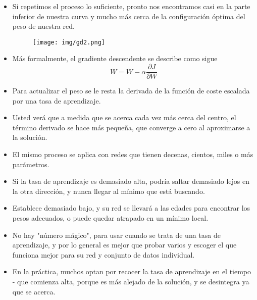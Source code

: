 \begin{frame}{\titulo}{\subtitulo}
    \begin{itemize}
        \footnotesize
        \item Si repetimos el proceso lo suficiente, pronto nos encontramos casi en la parte inferior de nuestra curva y mucho más cerca de la configuración óptima del peso de nuestra red.
        \begin{figure}[H]
            \texttt{[image: img/gd2.png]}
        \end{figure}

        \item Más formalmente, el gradiente descendente se describe como sigue $$ W = W - \alpha\frac{\partial J}{\partial W} $$

        \item Para actualizar el peso se le resta la derivada de la función de coste escalada por una tasa de aprendizaje.\bigskip

        \item Usted verá que a medida que se acerca cada vez más cerca del centro, el término derivado se hace más pequeña, que converge a cero al aproximarse a la solución.\bigskip

        \item El mismo proceso se aplica con redes que tienen decenas, cientos, miles o más parámetros.
    \end{itemize}
\end{frame}

\begin{frame}{\titulo}{\subtitulo}
    \begin{itemize}

        \item Si la tasa de aprendizaje es demasiado alta, podría saltar demasiado lejos en la otra dirección, y nunca llegar al mínimo que está buscando.\bigskip

        \item Establece demasiado bajo, y su red se llevará a las edades para encontrar los pesos adecuados, o puede quedar atrapado en un mínimo local.\bigskip

        \item No hay "número mágico", para usar cuando se trata de una tasa de aprendizaje, y por lo general es mejor que probar varios y escoger el que funciona mejor para su red y conjunto de datos individual.\bigskip

        \item En la práctica, muchos optan por recocer la tasa de aprendizaje en el tiempo - que comienza alta, porque es más alejado de la solución, y se desintegra ya que se acerca.
    \end{itemize}
\end{frame}

